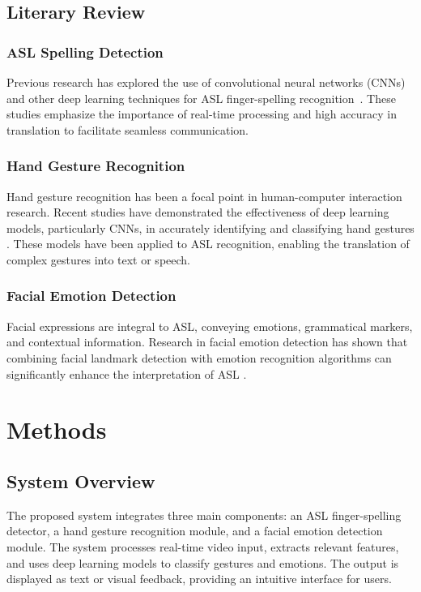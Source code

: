 \documentclass{article}
\begin{document}
\subsection{Literary Review}
\subsubsection{ASL Spelling Detection}
Previous research has explored the use of convolutional neural networks (CNNs) and other deep learning techniques for ASL finger-spelling recognition~\cite{Pigou2018}. These studies emphasize the importance of real-time processing and high accuracy in translation to facilitate seamless communication.

\subsubsection{Hand Gesture Recognition}
Hand gesture recognition has been a focal point in human-computer interaction research. Recent studies have demonstrated the effectiveness of deep learning models, particularly CNNs, in accurately identifying and classifying hand gestures \cite{Koller2016}. These models have been applied to ASL recognition, enabling the translation of complex gestures into text or speech.

\subsubsection{Facial Emotion Detection}
Facial expressions are integral to ASL, conveying emotions, grammatical markers, and contextual information. Research in facial emotion detection has shown that combining facial landmark detection with emotion recognition algorithms can significantly enhance the interpretation of ASL \cite{Huang2019}.

\section{Methods}
\subsection{System Overview}
The proposed system integrates three main components: an ASL finger-spelling detector, a hand gesture recognition module, and a facial emotion detection module. The system processes real-time video input, extracts relevant features, and uses deep learning models to classify gestures and emotions. The output is displayed as text or visual feedback, providing an intuitive interface for users.
\end{document}

